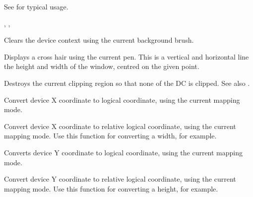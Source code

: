 See  for typical usage.


, , 

\label{wxdcclear}


Clears the device context using the current background brush.

\label{wxdccrosshair}


Displays a cross hair using the current pen. This is a vertical
and horizontal line the height and width of the window, centred
on the given point.

\label{wxdcdestroyclippingregion}


Destroys the current clipping region so that none of the DC is clipped.
See also .

\label{wxdcdevicetologicalx}


Convert device X coordinate to logical coordinate, using the current
mapping mode.

\label{wxdcdevicetologicalxrel}


Convert device X coordinate to relative logical coordinate, using the current
mapping mode. Use this function for converting a width, for example.

\label{wxdcdevicetologicaly}


Converts device Y coordinate to logical coordinate, using the current
mapping mode.

\label{wxdcdevicetologicalyrel}


Convert device Y coordinate to relative logical coordinate, using the current
mapping mode. Use this function for converting a height, for example.

